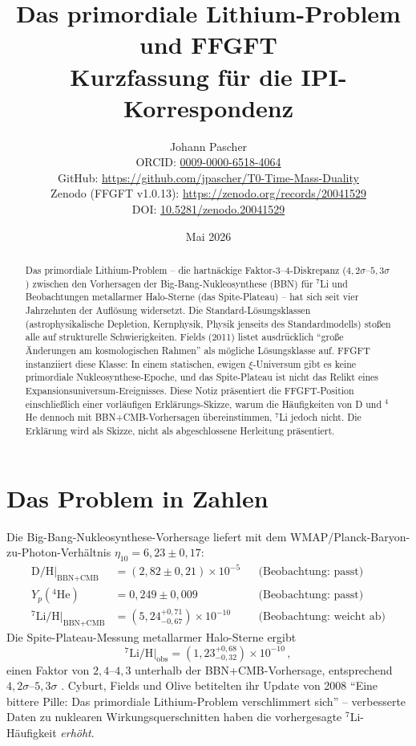 \documentclass[11pt,a4paper]{article}
\title{Das primordiale Lithium-Problem und FFGFT\\[2pt]
  \large Kurzfassung für die IPI-Korrespondenz}
\author{Johann Pascher\\[2pt]
\small ORCID: \href{https://orcid.org/0009-0000-6518-4064}{0009-0000-6518-4064}\\
\small GitHub: \url{https://github.com/jpascher/T0-Time-Mass-Duality}\\
\small Zenodo (FFGFT v1.0.13): \url{https://zenodo.org/records/20041529}\\
\small DOI: \href{https://doi.org/10.5281/zenodo.20041529}{10.5281/zenodo.20041529}}
\date{Mai 2026}
\begin{document}
\maketitle

\begin{abstract}
\noindent Das primordiale Lithium-Problem -- die hartnäckige Faktor-3--4-Diskrepanz ($4{,}2\sigma$--$5{,}3\sigma$) zwischen den Vorhersagen der Big-Bang-Nukleosynthese (BBN) für $^7$Li und Beobachtungen metallarmer Halo-Sterne (das Spite-Plateau) -- hat sich seit vier Jahrzehnten der Auflösung widersetzt. Die Standard-Lösungsklassen (astrophysikalische Depletion, Kernphysik, Physik jenseits des Standardmodells) stoßen alle auf strukturelle Schwierigkeiten. Fields (2011) listet ausdrücklich ``große Änderungen am kosmologischen Rahmen'' als mögliche Lösungsklasse auf. FFGFT instanziiert diese Klasse: In einem statischen, ewigen $\xi$-Universum gibt es keine primordiale Nukleosynthese-Epoche, und das Spite-Plateau ist nicht das Relikt eines Expansionsuniversum-Ereignisses. Diese Notiz präsentiert die FFGFT-Position einschließlich einer vorläufigen Erklärungs-Skizze, warum die Häufigkeiten von D und $^4$He dennoch mit BBN+CMB-Vorhersagen übereinstimmen, $^7$Li jedoch nicht. Die Erklärung wird als Skizze, nicht als abgeschlossene Herleitung präsentiert.
\end{abstract}

\section{Das Problem in Zahlen}

Die Big-Bang-Nukleosynthese-Vorhersage liefert mit dem WMAP/Planck-Baryon-zu-Photon-Verhältnis $\eta_{10} = 6{,}23 \pm 0{,}17$:
\begin{align}
\text{D/H}\big|_{\text{BBN+CMB}} &= (2{,}82 \pm 0{,}21) \times 10^{-5} &&\text{(Beobachtung: passt)}\\
Y_p(^4\text{He}) &= 0{,}249 \pm 0{,}009 &&\text{(Beobachtung: passt)}\\
^{7}\text{Li/H}\big|_{\text{BBN+CMB}} &= (5{,}24^{+0{,}71}_{-0{,}67}) \times 10^{-10} &&\text{(Beobachtung: weicht ab)}
\end{align}
Die Spite-Plateau-Messung \cite{spitespite1982,fields2011} metallarmer Halo-Sterne ergibt
\begin{equation}
^{7}\text{Li/H}\big|_{\text{obs}} = (1{,}23^{+0{,}68}_{-0{,}32}) \times 10^{-10}\,,
\end{equation}
einen Faktor von $2{,}4$--$4{,}3$ unterhalb der BBN+CMB-Vorhersage, entsprechend $4{,}2\sigma$--$5{,}3\sigma$ \cite{cyburt2008}. Cyburt, Fields und Olive betitelten ihr Update von 2008 ``Eine bittere Pille: Das primordiale Lithium-Problem verschlimmert sich'' -- verbesserte Daten zu nuklearen Wirkungsquerschnitten haben die vorhergesagte $^7$Li-Häufigkeit \emph{erhöht}.
\end{document}
